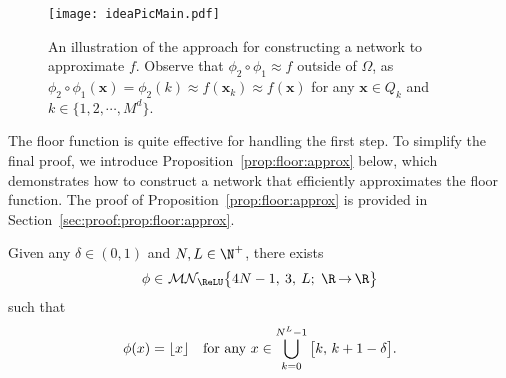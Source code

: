 \documentclass[11pt,a4paper]{article}
\let\dots\cdots
\begin{document}
\begin{figure}[ht]%
	\centering
	\texttt{[image: ideaPicMain.pdf]}
\caption{An illustration of the approach for constructing a network to approximate \( f \). 
Observe that \(\phi_2 \circ \phi_1 \approx f\) outside of \(\Omega\), as \(\phi_2 \circ \phi_1(\bm{x}) = \phi_2(k) \approx f(\bm{x}_k) \approx f(\bm{x})\) for any \(\bm{x} \in Q_k\) and \(k \in \{1, 2, \dots, M^d\}\). 
}
	\label{fig:idea:main}
\end{figure}


The floor function is quite effective for handling the first step. To simplify the final proof, we introduce Proposition~\ref{prop:floor:approx} below, which demonstrates how to construct a network that efficiently approximates the floor function. The proof of Proposition~\ref{prop:floor:approx} is provided in Section~\ref{sec:proof:prop:floor:approx}.



\begin{proposition}
	\label{prop:floor:approx}
	Given any $\delta\in (0,1)$ and $N,L\in \N^+$,
	there exists 
 \[\phi\in \mn[\big]{\ReLU}{4N-1}{3}{L}{\R}{\R}\]
 such that 
	\begin{equation*}
		\phi(x)=\lfloor x\rfloor\quad \textnormal{for any $x\in \bigcup_{k=0}^{N^L-1}\big[k,\, k+1-\delta\big].$}
	\end{equation*}
\end{proposition}





\end{document}
